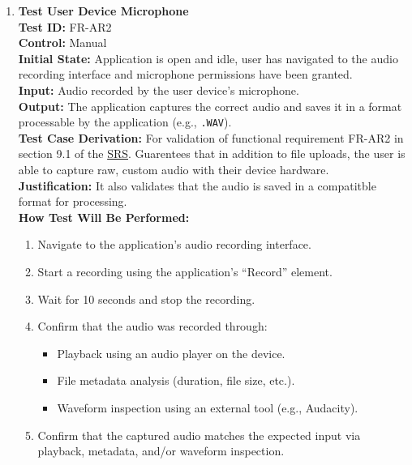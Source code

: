 \documentclass[12pt, titlepage]{article}
\begin{document}
\begin{enumerate}
  \item \textbf{Test User Device Microphone} \\
  \newline
  \textbf{Test ID:} FR-AR2 \\
  \textbf{Control:} Manual \\
  \textbf{Initial State:} Application is open and idle, user has navigated to the audio recording interface and microphone 
  permissions have been granted. \\
  \textbf{Input:} Audio recorded by the user device’s microphone. \\
  \textbf{Output:} The application captures the correct audio and saves it in a format processable by the application 
  (e.g., \texttt{.WAV}). \\
  \textbf{Test Case Derivation:} For validation of functional requirement FR-AR2 in section 9.1 of the 
  \href{https://github.com/emilyperica/ScoreGen/blob/main/docs/SRS-Volere/SRS.pdf}{SRS}. Guarentees that in addition to file uploads, 
  the user is able to capture raw, custom audio with their device hardware. \\
  \textbf{Justification:} It also validates that the audio is saved in a compatitble format for processing.\\
  \textbf{How Test Will Be Performed:}
  \begin{enumerate}
      \item Navigate to the application’s audio recording interface.
      \item Start a recording using the application’s “Record” element.
      \item Wait for 10 seconds and stop the recording.
      \item Confirm that the audio was recorded through:
      \begin{itemize}
          \item Playback using an audio player on the device.
          \item File metadata analysis (duration, file size, etc.).
          \item Waveform inspection using an external tool (e.g., Audacity).
      \end{itemize}
      \item Confirm that the captured audio matches the expected input via playback, metadata, and/or waveform inspection.
  \end{enumerate}
  

\end{enumerate}
\end{document}
